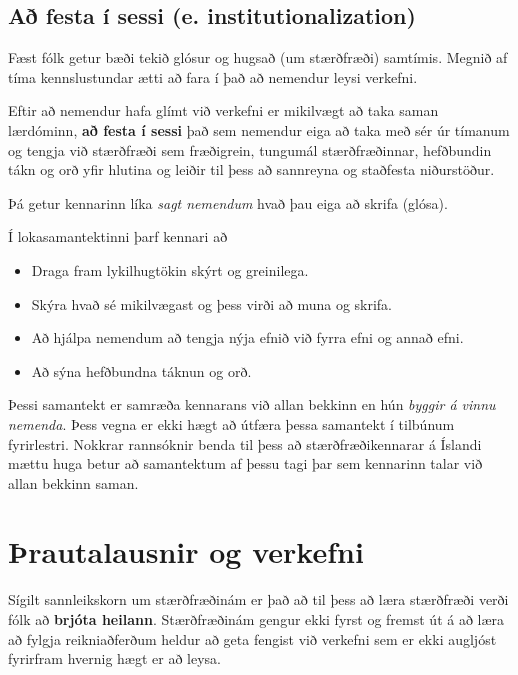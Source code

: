 \documentclass[
  icelandic,
]{book}
\providecommand{\tightlist}{%
  \setlength{\itemsep}{0pt}\setlength{\parskip}{0pt}}
\begin{document}
\section{Að festa í sessi (e. institutionalization)}\label{festa-sessi}

Fæst fólk getur bæði tekið glósur og hugsað (um stærðfræði) samtímis. Megnið af tíma kennslustundar ætti að fara í það að nemendur leysi verkefni.

Eftir að nemendur hafa glímt við verkefni er mikilvægt að taka saman lærdóminn, \textbf{að festa í sessi} það sem nemendur eiga að taka með sér úr tímanum og tengja við stærðfræði sem fræðigrein, tungumál stærðfræðinnar, hefðbundin tákn og orð yfir hlutina og leiðir til þess að sannreyna og staðfesta niðurstöður.

Þá getur kennarinn líka \emph{sagt nemendum} hvað þau eiga að skrifa (glósa).

Í lokasamantektinni þarf kennari að

\begin{itemize}
\tightlist
\item
  Draga fram lykilhugtökin skýrt og greinilega.
\item
  Skýra hvað sé mikilvægast og þess virði að muna og skrifa.
\item
  Að hjálpa nemendum að tengja nýja efnið við fyrra efni og annað efni.
\item
  Að sýna hefðbundna táknun og orð.
\end{itemize}

Þessi samantekt er samræða kennarans við allan bekkinn en hún \emph{byggir á vinnu nemenda}. Þess vegna er ekki hægt að útfæra þessa samantekt í tilbúnum fyrirlestri. Nokkrar rannsóknir benda til þess að stærðfræðikennarar á Íslandi mættu huga betur að samantektum af þessu tagi \autocite{oskarsdottir2014} \autocite{savola2008} þar sem kennarinn talar við allan bekkinn saman.

\chapter{Þrautalausnir og verkefni}\label{thrautir-verkefni}

Sígilt sannleikskorn um stærðfræðinám er það að til þess að læra stærðfræði verði fólk að \textbf{brjóta heilann}. Stærðfræðinám gengur ekki fyrst og fremst út á að læra að fylgja reikniaðferðum heldur að geta fengist við verkefni sem er ekki augljóst fyrirfram hvernig hægt er að leysa.
\end{document}
